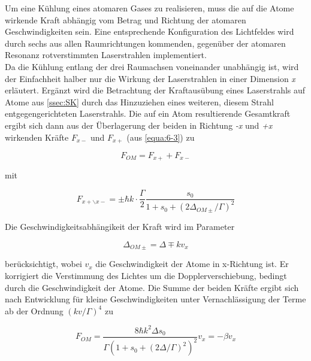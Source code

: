 \documentclass[
class=book,
accentcolor=1b,
custommargins=geometry,
fontsize=11pt,
thesis={type=Versuchsanleitung},
ruledheaders=all,
headline=false,
instbox=false,
marginpar=false,
title=small,
ignore-missing-data=true,
twoside=false,
logofile=apqdesign/tuda_logo.pdf,
pdfa=false %
]{apqpub}
\begin{document}
				Um eine Kühlung eines atomaren Gases zu realisieren, muss die auf die Atome wirkende Kraft abhängig vom Betrag und Richtung der atomaren Geschwindigkeiten sein. Eine entsprechende Konfiguration des Lichtfeldes wird durch sechs aus allen Raumrichtungen kommenden, gegenüber der atomaren Resonanz rotverstimmten Laserstrahlen implementiert.\\
				Da die Kühlung entlang der drei Raumachsen voneinander unabhängig ist, wird der Einfachheit halber
				nur die Wirkung der Laserstrahlen in einer Dimension \textit{x} erläutert. Ergänzt wird die Betrachtung der Kraftausübung eines Laserstrahls auf Atome aus \autoref{ssec:SK} durch das Hinzuziehen eines weiteren, diesem Strahl entgegengerichteten Laserstrahls. Die auf ein Atom resultierende Gesamtkraft ergibt sich dann aus der Überlagerung der beiden in Richtung \textit{-x} und \textit{+x} wirkenden Kräfte $F_{x-}$ und $F_{x+}$ (aus \autoref{equa:6-3}) zu
				
				\begin{equation}
				F_{OM} = F_{x+} + F_{x-}
				\end{equation}
				
				mit
				
				\begin{equation}\label{equa:6-5}
				F_{x+\backslash x-} = \pm \hbar k \cdot \frac{\varGamma}{2} \frac{s_0}{1+s_0+(2\varDelta_{OM\pm}/\varGamma)^2} 
				\end{equation}
				
				Die Geschwindigkeitsabhängikeit der Kraft wird im Parameter
				
				\begin{equation}
				\varDelta_{OM\pm} = \varDelta \mp k v_{x}
				\end{equation}
				
				berücksichtigt, wobei $v_x$ die Geschwindigkeit der Atome in x-Richtung ist. Er korrigiert die Verstimmung des Lichtes um die Dopplerverschiebung, bedingt durch die Geschwindigkeit der Atome. Die Summe der beiden Kräfte ergibt sich nach Entwicklung für kleine Geschwindigkeiten unter Vernachlässigung der Terme ab der Ordnung $(kv/\varGamma)^4$ zu
				
				\begin{equation}\label{equa:6-7}
				F_{OM} = \frac{8 \hbar k^2 \varDelta s_0}{\varGamma (1+s_0 + (2\varDelta/\varGamma)^2)^2} v_x = -\beta v_x
				\end{equation}
				
\end{document}
